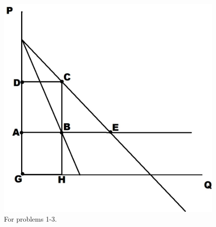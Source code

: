 \documentclass[
]{book}
\begin{document}
\begin{figure}

{\centering \includegraphics[width=0.75\linewidth]{img/monopoly/practicefigure} 

}

\caption{For problems 1-3.}\label{fig:practiceproblem}
\end{figure}
\end{document}
